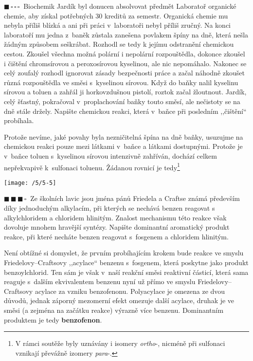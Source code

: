 \documentclass{book}
\newcommand{\jeden}{$\blacksquare \, \square \, \square \, \square \; \; $}
\newcommand{\tri}{$\blacksquare \, \blacksquare \, \blacksquare \, \square \; \; $}
\renewenvironment{quotation}{\par}{\par} %
\begin{document}
\hrulefill %
\begin{quotation}
\jeden Biochemik Jardík byl donucen absolvovat předmět Laboratoř organické
chemie, aby získal potřebných 30 kreditů za semestr. Organická chemie
mu nebyla příliš blízká a ani při práci v~laboratoři nebyl příliš
zručný. Na konci laboratoří mu jedna z~baněk zůstala zanešena povlakem
špíny na dně, která nešla žádným způsobem seškrábat. Rozhodl se tedy
k jejímu odstranění chemickou cestou. Zkoušel všechna možná polární
i nepolární rozpouštědla, dokonce zkoušel i čištění chromsírovou a
peroxosírovou kyselinou, ale nic nepomáhalo. Nakonec se celý zoufalý
rozhodl ignorovat zásady bezpečnosti práce a začal náhodně zkoušet
různá rozpouštědla ve směsi s~kyselinou sírovou. Když do baňky nalil
kyselinu sírovou a toluen a zahřál ji horkovzdušnou pistolí, roztok
začal žloutnout. Jardík, celý šťastný, pokračoval v~proplachování
baňky touto směsí, ale nečistoty se na dně stále držely. Napište chemickou
reakci, která v~baňce při posledním ,,čištění`` probíhala.
\end{quotation} \dotfill \par 
Protože nevíme, jaké povahy byla nezničitelná špína na dně baňky,
usuzujme na chemickou reakci pouze mezi látkami v~baňce a látkami
dostupnými. Protože je v~baňce toluen s~kyselinou sírovou intenzivně
zahříván, dochází celkem nepřekvapivě k~sulfonaci toluenu. Žádanou
rovnicí je tedy\footnote{V rámci soutěže byly uznávány i isomery \textit{ortho}-, nicméně při sulfonaci vznikají převážně izomery \textit{para}-.} 

\begin{center}
\texttt{[image: /5/5-5]}   
\end{center}

\newpage %
\begin{quotation}
\tri Ze školních lavic jsou jména pánů Friedela a Craftse známá především
díky jednoduchým alkylacím, při kterých se nechává benzen reagovat
s alkylchloridem a chloridem hlinitým. Znalost mechanismu této reakce
však dovoluje mnohem hravější syntézy. Napište dominantní aromatický
produkt reakce, při které necháte benzen reagovat s~fosgenem a chloridem
hlinitým.
\end{quotation} \dotfill \par 
Není obtížné si domyslet, že prvním probíhajícím krokem bude reakce
ve smyslu Friedelovy--Craftsovy ,,acylace`` benzenu s~fosgenem,
která poskytne jako produkt benzoylchlorid. Ten sám je však v~naší
reakční směsi reaktivní částicí, která sama reaguje s~dalším ekvivalentem
benzenu nyní už přímo ve smyslu Friedelovy--Craftsovy acylace za
vzniku benzofenonu. Polyacylace je omezena ze dvou důvodů, jednak
záporný mezomerní efekt omezuje další acylace, druhak je ve směsi
(a zejména na začátku reakce) výrazně více benzenu. Dominantním produktem
je tedy \textbf{benzofenon}.
\end{document}
